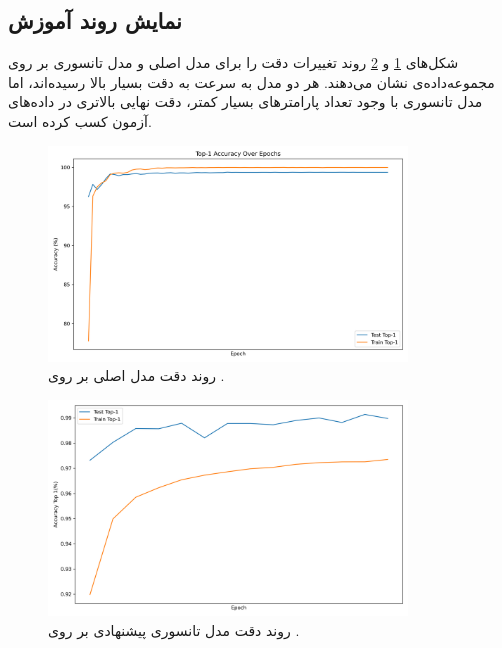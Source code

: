 \subsection{نمایش روند آموزش}

شکل‌های \ref{fig:mnist_swin_original} و \ref{fig:mnist_tensorized} روند تغییرات دقت  را برای مدل اصلی و مدل تانسوری بر روی مجموعه‌داده‌ی  نشان می‌دهند. هر دو مدل به سرعت به دقت بسیار بالا رسیده‌اند، اما مدل تانسوری با وجود تعداد پارامترهای بسیار کمتر، دقت نهایی بالاتری در داده‌های آزمون کسب کرده است.

\begin{figure}[ht]
	\centering
	\includegraphics[width=0.85\textwidth]{transformer_images/results/mnist_original.png}
	\caption{روند دقت  مدل اصلی  بر روی .}
	\label{fig:mnist_swin_original}
\end{figure}

\begin{figure}[ht]
	\centering
	\includegraphics[width=0.85\textwidth]{transformer_images/results/mnist_tensorized.png}
	\caption{روند دقت  مدل تانسوری پیشنهادی بر روی .}
	\label{fig:mnist_tensorized}
\end{figure}

